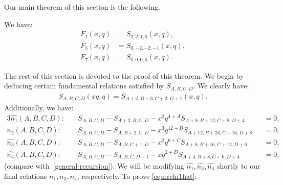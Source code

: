 \documentclass[ALCO,Unicode,published]{cedram}
\begin{document}
Our main theorem of this section is the following.
\begin{thm} 
\label{thm:nandimain}
We have:
\begin{align}
    F_1(x,q) &= S_{2,2,1,0}(x,q), \label{eqn:SF1}\\
    F_5(x,q) &= S_{0,-2,-2,-1}(x,q), \label{eqn:SF5}\\
    F_7(x,q) &= S_{0,0,0,0}(x,q). \label{eqn:SF7}
\end{align}
\end{thm}
The rest of this section is devoted to the proof of this theorem.
We begin by deducing certain fundamental relations satisfied by $S_{A,B,C,D}$.
We clearly have:
\begin{align}
S_{A,B,C,D}(xq,q)=S_{A+2,B+3,C+2,D+1}(x,q).
\label{eqn:Sshift}
\end{align}
Additionally, we have:
\begin{alignat}{3}
\widehat{n_1}(A,B,C,D):&\quad S_{A,B,C,D}-S_{A+2,B,C,D}-x^2q^{4+A}S_{A+8,B+12,C+8,D+4} &&=0, \label{eqn:reln1hat}\\
n_2(A,B,C,D):&\quad S_{A,B,C,D}-S_{A,B+2,C,D}-x^3q^{12+B}S_{A+12,B+24,C+16,D+8} &&=0, \\
\widehat{n_3}(A,B,C,D):&\quad S_{A,B,C,D}-S_{A,B,C+1,D}-x^2q^{6+C}S_{A+8,B+16,C+12,D+6}  &&=0, \label{eqn:reln3hat}\\
\widehat{n_4}(A,B,C,D):&\quad S_{A,B,C,D}-S_{A,B,C,D+1}-xq^{2+D}S_{A+4,B+8,C+6,D+4}  &&=0. \label{eqn:reln4hat}
\end{alignat}
(compare with~\eqref{general-recursion}). We will be modifying $\widehat{n_1}, \widehat{n_3}, \widehat{n_4}$ shortly to our final relations
$n_1, n_3, n_4$, respectively.
To prove \eqref{eqn:reln1hat}:
\end{document}
